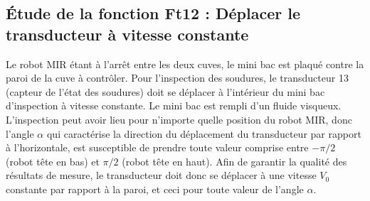 %
%
%
%
%
%
%
%
%

\subsection*{Étude de la fonction Ft12 : Déplacer le transducteur à vitesse constante}
\ifcolle
\else
Le robot MIR étant à l’arrêt entre les deux cuves, le mini bac est plaqué contre la paroi de la cuve à contrôler. Pour l’inspection des soudures, le transducteur 13 (capteur de l’état des soudures) doit se déplacer à l’intérieur du mini bac d’inspection à vitesse constante. Le mini bac est rempli d’un fluide visqueux. L’inspection peut avoir lieu pour n’importe quelle position du robot MIR, donc l’angle $\alpha$ qui caractérise la direction du déplacement du transducteur par rapport à l’horizontale, est susceptible de prendre toute valeur comprise entre $-\pi/2$ (robot tête en bas) et $\pi/2$ (robot tête en haut). Afin de garantir la qualité des résultats de mesure, le transducteur doit donc se déplacer à une vitesse $V_0$ constante par rapport à la paroi, et ceci pour toute valeur de l’angle $\alpha$.
\fi


